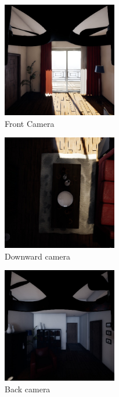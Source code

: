 \begin{figure}[!htb]
    \centering
    \begin{subfigure}{0.32\textwidth}
    \centering
        \includegraphics[height=5cm]{rapport/fig/Results/single/forward_center.jpeg}
        \caption{Front Camera}
        \label{fig:res_original_front}
    \end{subfigure}
    \begin{subfigure}{0.32\textwidth}
        \centering
        \includegraphics[height=5cm]{rapport/fig/Results/single/down_center.jpeg}
        \caption{Downward camera}
        \label{fig:res_original_down}
    \end{subfigure}    
    \begin{subfigure}{0.32\textwidth}
        \centering
        \includegraphics[height=5cm]{rapport/fig/Results/single/backward_center.jpeg}
        \caption{Back camera}
        \label{fig:res_original_back}
    \end{subfigure} \\[0.75ex]
    \begin{subfigure}{0.32\textwidth}

\end{subfigure}
\end{figure}
